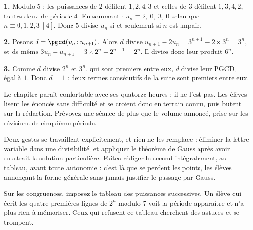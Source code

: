 \begin{corrige}
\textbf{1.} Modulo $5$ : les puissances de $2$ défilent $1,2,4,3$ et celles de
$3$ défilent $1,3,4,2$, toutes deux de période $4$. En sommant :
$u_{n} \equiv 2,\ 0,\ 3,\ 0$ selon que $n \equiv 0,1,2,3 \ [4]$. Donc $5$
divise $u_{n}$ si et seulement si $n$ est impair.

\textbf{2.} Posons $d = \pgcd(u_{n}\,;u_{n+1})$. Alors $d$ divise
$u_{n+1}-2u_{n} = 3^{n+1}-2\times3^{n} = 3^{n}$, et de même
$3u_{n}-u_{n+1} = 3\times2^{n}-2^{n+1} = 2^{n}$. Il divise donc leur produit
$6^{n}$.

\textbf{3.} Comme $d$ divise $2^{n}$ et $3^{n}$, qui sont premiers entre eux,
$d$ divise leur PGCD, égal à $1$. Donc $d = 1$ : deux termes consécutifs de la
suite sont premiers entre eux.
\end{corrige}

\begin{notepourlaclasse}
Le chapitre paraît confortable avec ses quatorze heures ; il ne l'est pas. Les
élèves lisent les énoncés sans difficulté et se croient donc en terrain connu,
puis butent sur la rédaction. Prévoyez une séance de plus que le volume
annoncé, prise sur les révisions de cinquième période.

Deux gestes se travaillent explicitement, et rien ne les remplace : éliminer
la lettre variable dans une divisibilité, et appliquer le théorème de Gauss
après avoir soustrait la solution particulière. Faites rédiger le second
intégralement, au tableau, avant toute autonomie : c'est là que se perdent les
points, les élèves annonçant la forme générale sans jamais justifier le
passage par Gauss.

Sur les congruences, imposez le tableau des puissances successives. Un élève
qui écrit les quatre premières lignes de $2^{n}$ modulo $7$ voit la période
apparaître et n'a plus rien à mémoriser. Ceux qui refusent ce tableau
cherchent des astuces et se trompent.
\end{notepourlaclasse}
